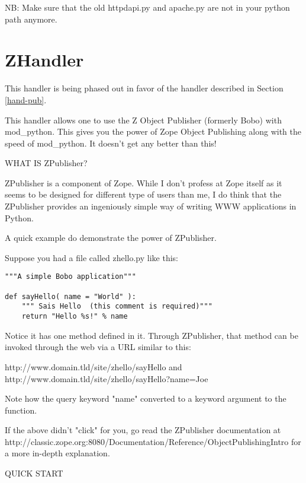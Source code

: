 NB: Make sure that the old httpdapi.py and apache.py are not in your
python path anymore.

\section{ZHandler\label{hand-z}}

 This handler is being phased out in favor of the
 handler described in 
Section \ref{hand-pub}.

This handler allows one to use the Z Object Publisher (formerly Bobo)
with mod_python. This gives you the power of Zope Object Publishing
along with the speed of mod_python. It doesn't get any better than
this!

WHAT IS ZPublisher?

ZPublisher is a component of Zope. While I don't profess at Zope
itself as it seems to be designed for different type of users than me,
I do think that the ZPublisher provides an ingeniously simple way of
writing WWW applications in Python.

A quick example do demonstrate the power of ZPublisher.

Suppose you had a file called zhello.py like this:

\begin{verbatim}
"""A simple Bobo application"""

def sayHello( name = "World" ):
    """ Sais Hello  (this comment is required)"""
    return "Hello %s!" % name
\end{verbatim}

Notice it has one method defined in it. Through ZPublisher, that
method can be invoked through the web via a URL similar to this:

http://www.domain.tld/site/zhello/sayHello and \\
http://www.domain.tld/site/zhello/sayHello?name=Joe

Note how the query keyword "name" converted to a keyword argument to
the function.

If the above didn't "click" for you, go read the ZPublisher
documentation at
http://classic.zope.org:8080/Documentation/Reference/ObjectPublishingIntro
for a more in-depth explanation.

QUICK START

